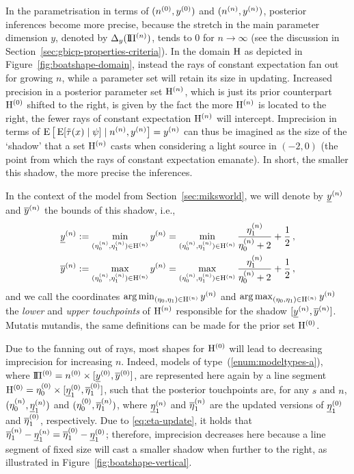 In the parametrisation in terms of $(n^{(0)},y^{(0)})$ and $(n^{(n)}, y^{(n)})$,
posterior inferences become more precise,
because the stretch in the main parameter dimension $y$, denoted by $\Delta_y(\text{I}\!\Pi^{(n)})$,
tends to $0$ for $n \to \infty$ (see the discussion in Section~\ref{sec:gbicp-properties-criteria}).
In the domain $\mathrm{H}$ as depicted in Figure~\ref{fig:boatshape-domain},
instead the rays of constant expectation fan out for growing $n$, %
while a parameter set will retain its size in updating.
Increased precision in a posterior parameter set $\mathrm{H}^{(n)}$, which is just
its prior counterpart $\mathrm{H}^{(0)}$ shifted to the right,
is given by the fact the more $\mathrm{H}^{(n)}$ is located to the right,
the fewer rays of constant expectation $\mathrm{H}^{(n)}$ will intercept.
Imprecision in terms of $\operatorname{E}\big[\operatorname{E}[\tilde{\tau}(x) \mid \psi] \mid n^{(n)}, y^{(n)}\big] = y^{(n)}$
can thus be imagined as the size of the `shadow' that a set $\mathrm{H}^{(n)}$ casts
when considering a light source in $(-2,0)$ (the point from which the rays of constant expectation emanate).
In short, the smaller this shadow, the more precise the inferences.

In the context of the model from Section~\ref{sec:miksworld},
we will denote by $\underline{y}^{(n)}$ and $\overline{y}^{(n)}$ the bounds of this shadow,
i.e.,
\begin{align*}
\underline{y}^{(n)} &:= \min_{(\eta_0^{(n)},\eta_1^{(n)}) \in \mathrm{H}^{(n)}} y^{(n)} = \min_{(\eta_0^{(n)},\eta_1^{(n)}) \in \mathrm{H}^{(n)}} \frac{\eta_1^{(n)}}{\eta_0^{(n)}+2} + \frac{1}{2}\,, \\
\overline{y}^{(n)} &:= \max_{(\eta_0^{(n)},\eta_1^{(n)}) \in \mathrm{H}^{(n)}} y^{(n)} = \max_{(\eta_0^{(n)},\eta_1^{(n)}) \in \mathrm{H}^{(n)}} \frac{\eta_1^{(n)}}{\eta_0^{(n)}+2} + \frac{1}{2}\,,
\end{align*}
and we call the coordinates $\arg\min_{(\eta_0,\eta_1) \in \mathrm{H}^{(n)}} y^{(n)}$ and $\arg\max_{(\eta_0,\eta_1) \in \mathrm{H}^{(n)}} y^{(n)}$
the \emph{lower} and \emph{upper touchpoints} of $\mathrm{H}^{(n)}$ responsible for the shadow $[\underline{y}^{(n)}, \overline{y}^{(n)}]$.
Mutatis mutandis, the same definitions can be made for the prior set $\mathrm{H}^{(0)}$.

Due to the fanning out of rays, most shapes for $\mathrm{H}^{(0)}$ will lead to decreasing imprecision for increasing $n$.
Indeed, models of type~(\ref{enum:modeltypes-a}),
where $\text{I}\!\Pi^{(0)} = n^{(0)} \times [\underline{y}^{(0)}, \overline{y}^{(0)}]$,
are represented here again by a line segment $\mathrm{H}^{(0)} = \eta_0^{(0)} \times [\underline{\eta}_1^{(0)},\overline{\eta}_1^{(0)}]$,
such that the posterior touchpoints are, for any $s$ and $n$, $(\eta_0^{(n)},\underline{\eta}_1^{(n)})$ and $(\eta_0^{(0)},\overline{\eta}_1^{(n)})$,
where $\underline{\eta}_1^{(n)}$ and $\overline{\eta}_1^{(n)}$ are the updated versions of $\underline{\eta}_1^{(0)}$ and $\overline{\eta}_1^{(0)}$, respectively.
Due to \eqref{eq:eta-update}, it holds that $\overline{\eta}_1^{(n)}-\underline{\eta}_1^{(n)} = \overline{\eta}_1^{(0)}-\underline{\eta}_1^{(0)}$;
therefore, imprecision decreases here because a line segment of fixed size
will cast a smaller shadow when further to the right,
as illustrated in Figure~\ref{fig:boatshape-vertical}.

